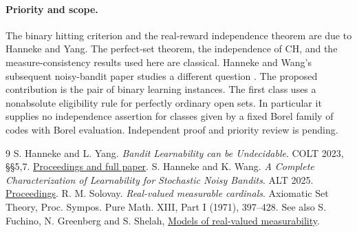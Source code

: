 \documentclass[11pt]{article}
\begin{document}
\paragraph{Priority and scope.} The binary hitting criterion and the real-reward independence theorem are due to Hanneke and Yang. The perfect-set theorem, the independence of CH, and the measure-consistency results used here are classical. Hanneke and Wang's subsequent noisy-bandit paper studies a different question \cite{hw}. The proposed contribution is the pair of binary learning instances. The first class uses a nonabsolute eligibility rule for perfectly ordinary open sets. In particular it supplies no independence assertion for classes given by a fixed Borel family of codes with Borel evaluation. Independent proof and priority review is pending.
\begin{thebibliography}{9}
 S. Hanneke and L. Yang. \emph{Bandit Learnability can be Undecidable}. COLT 2023, \S\S5,7. \href{https://proceedings.mlr.press/v195/hanneke23d.html}{Proceedings and full paper}.
 S. Hanneke and K. Wang. \emph{A Complete Characterization of Learnability for Stochastic Noisy Bandits}. ALT 2025. \href{https://proceedings.mlr.press/v272/hanneke25c.html}{Proceedings}.
 R. M. Solovay. \emph{Real-valued measurable cardinals}. Axiomatic Set Theory, Proc. Sympos. Pure Math. XIII, Part I (1971), 397--428. See also S. Fuchino, N. Greenberg and S. Shelah, \href{https://arxiv.org/abs/math/0601087}{Models of real-valued measurability}.
\end{thebibliography}
\end{document}
